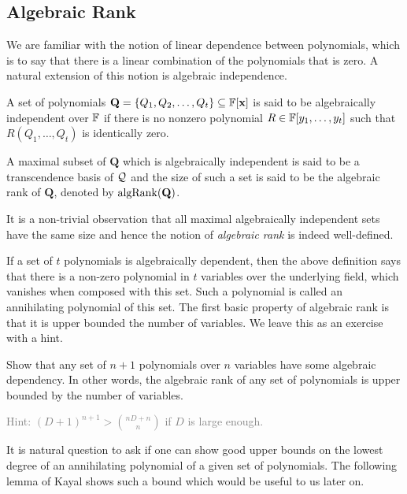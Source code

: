 \subsection{Algebraic Rank}

We are familiar with the notion of linear dependence between polynomials, which is to say that there is a linear combination of the polynomials that is zero. A natural extension of this notion is algebraic independence. 

\begin{definition}
A set of polynomials $\mathbf{Q} = \{Q_1, Q_2, \ldots, Q_t\} \subseteq \mathbb{F}[\mathbf{x}]$ is said to be algebraically independent over $\mathbb{F}$ if there is no nonzero polynomial $R \in \mathbb{F}[y_1,\ldots, y_t]$ such that $R(Q_1, \ldots, Q_t)$ is identically zero. 

A maximal subset of $\mathbf{Q}$ which is algebraically independent is said to be a transcendence basis of $\cal Q$ and the size of such a set is said to be the algebraic rank of $\mathbf{Q}$, denoted by $\operatorname{\mathrm{algRank}}(\mathbf{Q})$. 
\end{definition}

It is a non-trivial observation that all maximal algebraically independent sets have the same size and hence the notion of \emph{algebraic rank} is indeed well-defined. 

\medskip

If a set of $t$ polynomials is algebraically dependent, then the above definition says that there is a non-zero polynomial in $t$ variables over the underlying field, which vanishes when composed with this set. Such a polynomial is called an annihilating polynomial of this set. The first basic property of algebraic rank is that it is upper bounded the number of variables. We leave this as an exercise with a hint. \\

\begin{exercise}
Show that any set of $n+1$ polynomials over $n$ variables have some algebraic dependency. In other words, the algebraic rank of any set of polynomials is upper bounded by the number of variables.

\textcolor{Gray}{Hint: $(D+1)^{n+1} > \binom{nD+n}{n}$ if $D$ is large enough.}
\end{exercise}

It is natural question to ask if one can show good upper bounds on the lowest degree of an annihilating polynomial of a given set of polynomials. The following lemma of Kayal shows such a bound which would be useful to us later on. 

